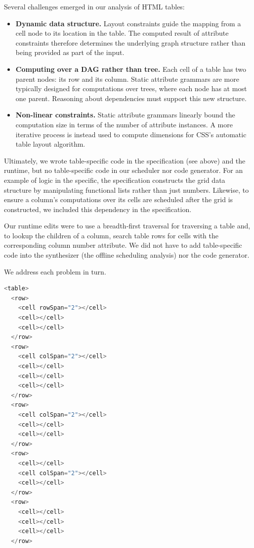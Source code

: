 Several challenges emerged in our analysis of HTML tables:
\begin{itemize}
\item \textbf{Dynamic data structure.} Layout constraints guide the mapping from a cell node to its location in the table. The computed result of attribute constraints therefore determines the underlying graph structure rather than being provided as part of the input. 
\item \textbf{Computing over a DAG rather than tree.} Each cell of a table has two parent nodes: its row and its column. Static attribute grammars are more typically designed for computations over trees, where each node has at most one parent. Reasoning about dependencies must support this new structure.
\item \textbf{Non-linear constraints.} Static attribute grammars linearly bound the computation size in terms of the number of attribute instances. A more iterative process is instead used to compute dimensions for CSS's automatic table layout algorithm.  
\end{itemize}

Ultimately, we wrote table-specific code in the specification (see above) and the runtime, but no table-specific code in our scheduler nor code generator. For an example of logic in the specific, the specification constructs the grid data structure  by manipulating functional lists rather than just numbers. Likewise, to ensure a column's computations over its cells are scheduled after the grid is constructed, we included this dependency in the specification. 

Our runtime edits were to use a breadth-first traversal for traversing a table and, to lookup the children of a column, search table rows for cells with the corresponding column number attribute. We did not have to add table-specific code into the synthesizer (the offline scheduling analysis) nor the code generator. 

We address each problem in turn.


\newsavebox{\tabletransitivebox}
\begin{lrbox}{\tabletransitivebox}%
\begin{lstlisting}[language=C++,morekeywords={spawn,join,reverse,parallel_for}]
<table>
  <row>
    <cell rowSpan="2"></cell>
    <cell></cell>
    <cell></cell>
  </row>
  <row>
    <cell colSpan="2"></cell>
    <cell></cell>
    <cell></cell>
    <cell></cell>
  </row>
  <row>
    <cell colSpan="2"></cell>
    <cell></cell>
    <cell></cell>
  </row>
  <row>
    <cell></cell>
    <cell colSpan="2"></cell>
    <cell></cell>
  </row>
  <row>
    <cell></cell>
    <cell></cell>
    <cell></cell>
  </row>
\end{lstlisting}
\end{lrbox}



